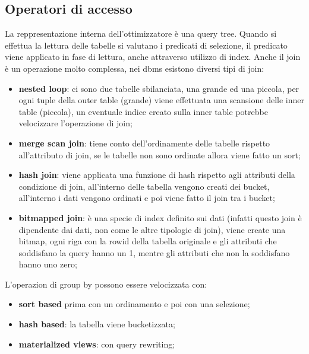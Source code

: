 \documentclass[12pt]{article}
\begin{document}
\subsection{Operatori di accesso}
La reppresentazione interna dell'ottimizzatore \`e una query tree. Quando si effettua la lettura delle tabelle si valutano i predicati di selezione, il predicato viene applicato in fase di lettura, anche attraverso utilizzo di index. Anche il join \`e un operazione molto complessa, nei dbms esistono diversi tipi di join:
\begin{itemize}
    \item \textbf{nested loop}: ci sono due tabelle sbilanciata, una grande ed una piccola, per ogni tuple della outer table (grande) viene effettuata una scansione delle inner table (piccola), un eventuale indice creato sulla inner table potrebbe velocizzare l'operazione di join;
    \item \textbf{merge scan join}: tiene conto dell'ordinamente delle tabelle rispetto all'attributo di join, se le tabelle non sono ordinate allora viene fatto un sort;
    \item \textbf{hash join}: viene applicata una funzione di hash rispetto agli attributi della condizione di join, all'interno delle tabella vengono creati dei bucket, all'interno i dati vengono ordinati e poi viene fatto il join tra i bucket;
    \item \textbf{bitmapped join}: \`e una specie di index definito sui dati (infatti questo join \`e dipendente dai dati, non come le altre tipologie di join), viene create una bitmap, ogni riga con la rowid della tabella originale e gli attributi che soddisfano la query hanno un 1, mentre gli attributi che non la soddisfano hanno uno zero;
\end{itemize}
L'operazion di group by possono essere velocizzata con:
\begin{itemize}
    \item \textbf{sort based} prima con un ordinamento e poi con una selezione;
    \item \textbf{hash based}: la tabella viene bucketizzata;
    \item \textbf{materialized views}: con query rewriting;
\end{itemize}
\end{document}
